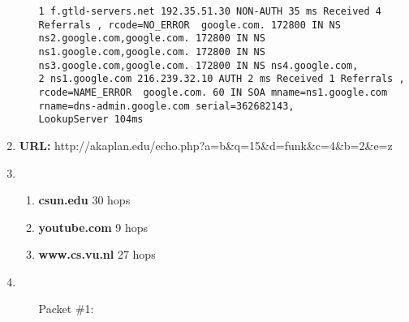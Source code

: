 \documentclass{article}
\begin{document}
\begin{enumerate}
\begin{enumerate}
\begin{lstlisting}
1 f.gtld-servers.net 192.35.51.30 NON-AUTH 35 ms Received 4 Referrals , rcode=NO_ERROR  google.com. 172800 IN NS ns2.google.com,google.com. 172800 IN NS ns1.google.com,google.com. 172800 IN NS ns3.google.com,google.com. 172800 IN NS ns4.google.com,
2 ns1.google.com 216.239.32.10 AUTH 2 ms Received 1 Referrals , rcode=NAME_ERROR  google.com. 60 IN SOA mname=ns1.google.com rname=dns-admin.google.com serial=362682143,
LookupServer 104ms
       \end{lstlisting}
    \end{enumerate}
    \item \textbf{URL:} http://akaplan.edu/echo.php?a=b\&q=15\&d=funk\&c=4\&b=2\&e=z
    \item \begin{enumerate}
        \item \textbf{csun.edu} 30 hops
        \item \textbf{youtube.com} 9 hops
        \item \textbf{www.cs.vu.nl} 27 hops
    \end{enumerate}
    \item \begin{enumerate}
        \item[]
        \item[Packet \#1:] 
    \end{enumerate}
\end{enumerate}
\end{document}
